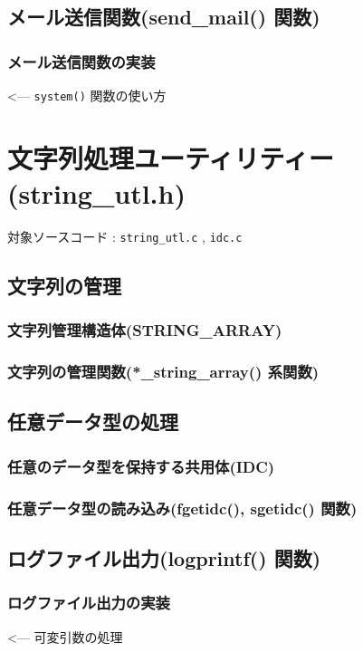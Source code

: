 \documentclass[a4paper,10pt]{jarticle}
\begin{document}
\subsection{メール送信関数(send\_mail() 関数)}
\subsubsection{メール送信関数の実装}   <--- \verb|system()| 関数の使い方


\section{文字列処理ユーティリティー(string\_utl.h)}
対象ソースコード : \verb|string_utl.c| , \verb|idc.c|

\subsection{文字列の管理}
\subsubsection{文字列管理構造体(STRING\_ARRAY)}
\subsubsection{文字列の管理関数(*\_string\_array() 系関数)}

\subsection{任意データ型の処理}
\subsubsection{任意のデータ型を保持する共用体(IDC)}
\subsubsection{任意データ型の読み込み(fgetidc(), sgetidc() 関数)}

\subsection{ログファイル出力(logprintf() 関数)}
\subsubsection{ログファイル出力の実装}  <--- 可変引数の処理
\end{document}
